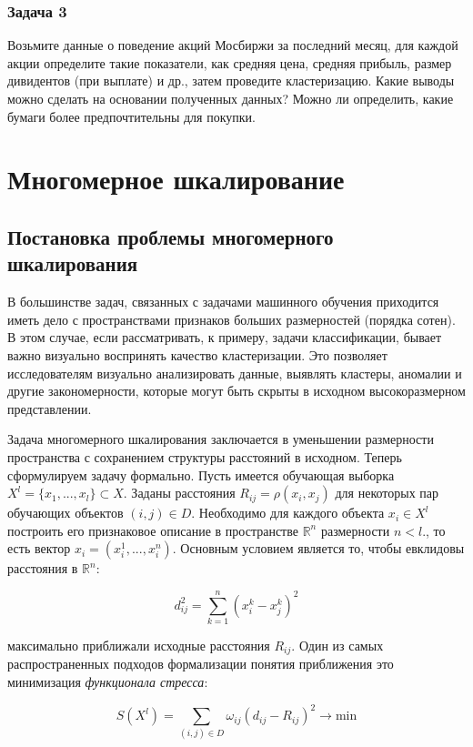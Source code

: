 \subsubsection*{Задача 3}
Возьмите данные о поведение акций Мосбиржи за последний месяц, для каждой акции определите такие показатели, как средняя цена, средняя прибыль, размер дивидентов (при выплате) и др., затем проведите кластеризацию. Какие выводы можно сделать на основании полученных данных? Можно ли определить, какие бумаги более предпочтительны для покупки.

\section*{Многомерное шкалирование}

\subsection*{Постановка проблемы многомерного шкалирования}

В большинстве задач, связанных с задачами машинного обучения приходится иметь дело с пространствами признаков больших размерностей (порядка сотен). В этом случае, если рассматривать, к примеру, задачи классификации, бывает важно визуально воспринять качество кластеризации.  Это позволяет исследователям визуально анализировать данные, выявлять кластеры, аномалии и другие закономерности, которые могут быть скрыты в исходном высокоразмерном представлении.

Задача многомерного шкалирования заключается в уменьшении размерности пространства с сохранением структуры расстояний в исходном. Теперь сформулируем задачу формально. Пусть имеется обучающая выборка $X^l=\{x_1, ..., x_l\} \subset X$. Заданы расстояния $R_{ij} = \rho(x_i, x_j)$ для некоторых пар обучающих объектов $(i, j) \in D$. Необходимо для каждого объекта $x_i \in X^l$ построить его признаковое описание в пространстве $\mathbb{R}^n$ размерности $n < l$., то есть вектор $x_i = (x_i^1, ..., x_i^n)$. Основным условием является то, чтобы евклидовы расстояния в $\mathbb{R}^n$:

$$d_{ij}^2= \sum_{k = 1}^n (x_i^k - x_j^k)^2$$

максимально приближали исходные расстояния $R_{ij}$. Один из самых распространенных подходов формализации понятия приближения это минимизация \textit{функционала стресса}:

$$S(X^l) = \sum_{(i, j) \in D} \omega_{ij}(d_{ij}- R_{ij})^2 \rightarrow \mathrm{min}$$

